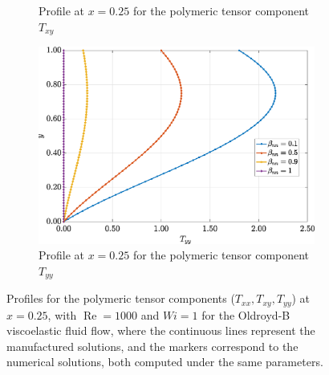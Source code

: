 \documentclass[preprint, 12pt]{elsarticle}
\begin{document}
\begin{figure}[H]
\begin{subfigure}[b]{.46\textwidth}
        \caption{Profile at $x=0.25$ for the polymeric tensor component $T_{xy}$}
        \label{fig_slice_x_txy_2nd_Case1_oldorydb}
    \end{subfigure}
    \begin{subfigure}[b]{.46\textwidth}
        \includegraphics[width=\textwidth]{Slice_x_Tog_Numerical_NormErr_2nd_Betann_1_Re_1000_Wi_1_epsilon_0_xi_0_alphaG_0_Dt_1e-06_at_0.05_tipsim_1_MMS_12_x0.25y0.25_Tyy.eps}
        \caption{Profile at $x=0.25$ for the polymeric tensor component $T_{yy}$}
        \label{fig_slice_x_tyy_2nd_Case1_oldroydB}
    \end{subfigure}
    \vspace{0.02cm}
    \caption{Profiles for the polymeric tensor components ($T_{xx}, T_{xy}, T_{yy}$) at $x=0.25$, with $\operatorname{Re}=1000$ and $Wi=1$ for the Oldroyd-B viscoelastic fluid flow, where the continuous lines represent the manufactured solutions, and the markers correspond to the numerical solutions, both computed under the same parameters.\label{fig_slice_Solution_TxxTxyTyy_oldroydb_x}}
\end{figure}
\end{document}
